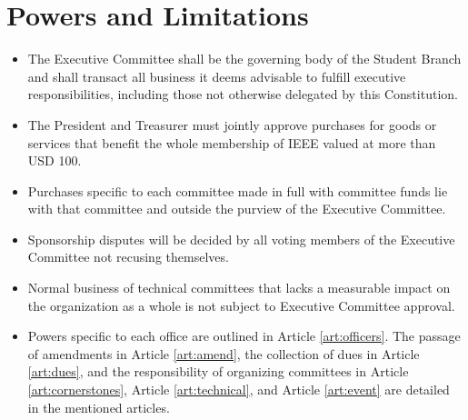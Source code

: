\documentclass[12pt]{constitution}
\begin{document}
\section{Powers and Limitations}
\label{sec:exec_pow}
\begin{itemize}
    \item The Executive Committee shall be the governing body of the Student Branch and shall transact all business it deems advisable to fulfill executive responsibilities, including those not otherwise delegated by this Constitution.
    \item The President and Treasurer must jointly approve purchases for goods or services that benefit the whole membership of IEEE valued at more than USD 100.
    \item Purchases specific to each committee made in full with committee funds lie with that committee and outside the purview of the Executive Committee.
    \item Sponsorship disputes will be decided by all voting members of the Executive Committee not recusing themselves.
    \item Normal business of technical committees that lacks a measurable impact on the organization as a whole is not subject to Executive Committee approval.
    \item Powers specific to each office are outlined in Article \ref{art:officers}. The passage of amendments in Article \ref{art:amend}, the collection of dues in Article \ref{art:dues}, and the responsibility of organizing committees in Article \ref{art:cornerstones}, Article \ref{art:technical}, and Article \ref{art:event} are detailed in the mentioned articles.
\end{itemize}
\end{document}
